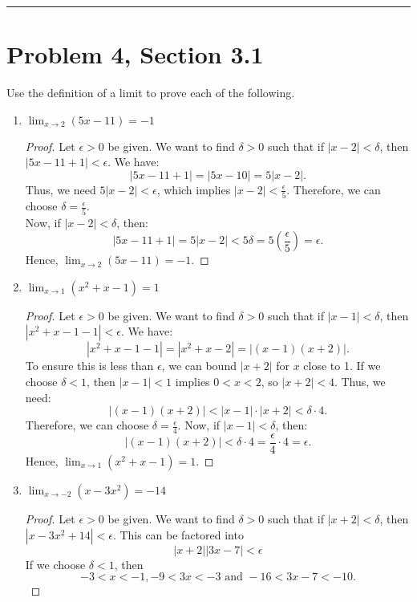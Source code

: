 \documentclass[12pt]{article}
\author{Kiran Jones \\
  \texttt{kiran.p.jones.27@dartmouth.edu}}
\date{Due: July 30, 2025}
\begin{document}
  \maketitle
  \thispagestyle{empty}
  \noindent
  \rule{\linewidth}{0.4pt}
  \newpage
  

  
  \section*{Problem 4, Section 3.1}
  Use the definition of a limit to prove each of the following.
  \begin{enumerate}[label=(\alph*)]
    \item $\lim_{x \to 2}(5x-11) = -1$
    
    \begin{proof}
      Let $\epsilon > 0$ be given. We want to find $\delta > 0$ such that if $|x - 2| < \delta$, then $|5x - 11 + 1| < \epsilon$.
      We have:
      \[|5x - 11 + 1| = |5x - 10| = 5|x - 2|.\]
      Thus, we need $5|x - 2| < \epsilon$, which implies $|x - 2| < \frac{\epsilon}{5}$. 
      Therefore, we can choose $\delta = \frac{\epsilon}{5}$.
      \\
      Now, if $|x - 2| < \delta$, then:
      \[|5x - 11 + 1| = 5|x - 2| < 5\delta = 5\left(\frac{\epsilon}{5}\right) = \epsilon.\]
      Hence, $\lim_{x \to 2}(5x-11) = -1$. 
    \end{proof}
    \item $\lim_{x \to 1}(x^2 + x - 1) = 1$
    \begin{proof}
      Let $\epsilon > 0$ be given. We want to find $\delta > 0$ such that if $|x - 1| < \delta$, then $|x^2 + x - 1 - 1| < \epsilon$.
      We have:
      \[|x^2 + x - 1 - 1| = |x^2 + x - 2| = |(x-1)(x+2)|.\]
      To ensure this is less than $\epsilon$, we can bound $|x + 2|$ for $x$ close to 1. 
      If we choose $\delta < 1$, then $|x - 1| < 1$ implies $0 < x < 2$, so $|x + 2| < 4$. 
      Thus, we need:
      \[|(x-1)(x+2)| < |x-1| \cdot |x+2| < \delta \cdot 4.\]
      Therefore, we can choose $\delta = \frac{\epsilon}{4}$.
      Now, if $|x - 1| < \delta$, then:
      \[|(x-1)(x+2)| < \delta \cdot 4 = \frac{\epsilon}{4} \cdot 4 = \epsilon.\]
      Hence, $\lim_{x \to 1}(x^2 + x - 1) = 1$.
    \end{proof}
    \item $\lim_{x \to -2}(x-3x^2) = -14$
    
    \begin{proof}
      Let $\epsilon > 0$ be given. We want to find $\delta > 0$ such that if $|x + 2| < \delta$, then $|x - 3x^2 + 14| < \epsilon$.
      This can be factored into 
      \[|x+2||3x-7|<\epsilon\]
      If we choose $\delta < 1$, then 
      \[-3 < x < -1, -9 < 3x < -3 \text{ and } -16 < 3x - 7 < -10.\]


\end{proof}
\end{enumerate}
\end{document}
